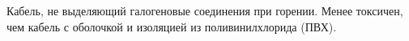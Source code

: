 Кабель, не выделяющий галогеновые соединения при 
горении. Менее токсичен, чем кабель с оболочкой и изоляцией
из поливинилхлорида (ПВХ).